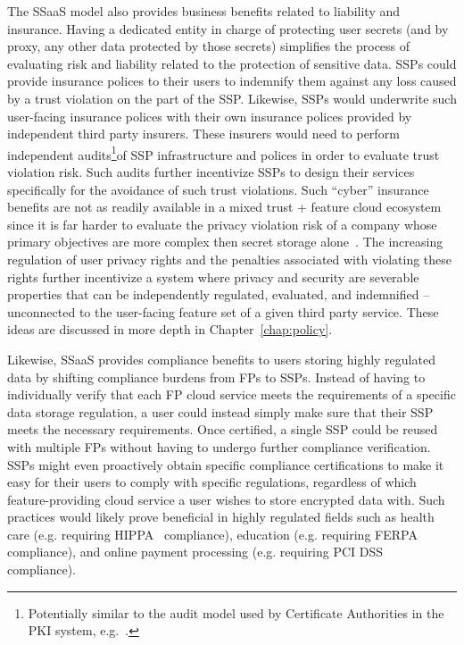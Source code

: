 The SSaaS model also provides business benefits related to liability
and insurance. Having a dedicated entity in charge of protecting user
secrets (and by proxy, any other data protected by those secrets)
simplifies the process of evaluating risk and liability related to the
protection of sensitive data. SSPs could provide insurance polices to
their users to indemnify them against any loss caused by a trust
violation on the part of the SSP. Likewise, SSPs would underwrite such
user-facing insurance polices with their own insurance polices
provided by independent third party insurers. These insurers would
need to perform independent audits\footnote{Potentially similar to the
  audit model used by Certificate Authorities in the PKI system,
  e.g.~\cite{hall-caaudit, mozilla-capolicy}.}of SSP infrastructure
and polices in order to evaluate trust violation risk. Such audits
further incentivize SSPs to design their services specifically for the
avoidance of such trust violations. Such ``cyber'' insurance benefits
are not as readily available in a mixed trust + feature cloud
ecosystem since it is far harder to evaluate the privacy violation
risk of a company whose primary objectives are more complex then
secret storage alone~\cite{ciab2015}. The increasing regulation of
user privacy rights and the penalties associated with violating these
rights further incentivize a system where privacy and security are
severable properties that can be independently regulated, evaluated,
and indemnified -- unconnected to the user-facing feature set of a
given third party service. These ideas are discussed in more depth in
Chapter~\ref{chap:policy}.

Likewise, SSaaS provides compliance benefits to users storing highly
regulated data by shifting compliance burdens from FPs to
SSPs. Instead of having to individually verify that each FP cloud
service meets the requirements of a specific data storage regulation,
a user could instead simply make sure that their SSP meets the
necessary requirements. Once certified, a single SSP could be reused
with multiple FPs without having to undergo further compliance
verification. SSPs might even proactively obtain specific compliance
certifications to make it easy for their users to comply with specific
regulations, regardless of which feature-providing cloud service a
user wishes to store encrypted data with. Such practices would likely
prove beneficial in highly regulated fields such as health care
(e.g. requiring HIPPA~\cite{hippa} compliance), education
(e.g. requiring FERPA~\cite{ferpa} compliance), and online payment
processing (e.g. requiring PCI DSS~\cite{pcidss} compliance).

